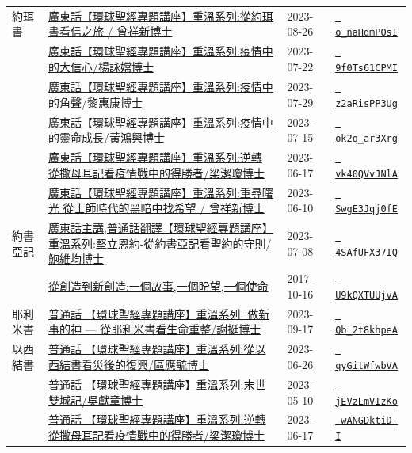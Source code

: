 \documentclass{book}
\begin{document}
{\begin{xltabular}{\textwidth}{|p{0.15\textwidth} p{0.6\textwidth}|p{0.07\textwidth} p{0.1\textwidth}|}
約珥書   & \hyperref[sec:o_naHdmPOsI]{廣東話【環球聖經專題講座】重溫系列:從約珥書看信之旅 / 曾祥新博士} & 2023-08-26 & \href{https://youtube.com/watch?v=o_naHdmPOsI}{\texttt{ o\_naHdmPOsI}} \\
    & \hyperref[sec:9f0Ts61CPMI]{廣東話【環球聖經專題講座】重溫系列:疫情中的大信心/楊詠嫦博士} & 2023-07-22 & \href{https://youtube.com/watch?v=9f0Ts61CPMI}{\texttt{ 9f0Ts61CPMI}} \\
    & \hyperref[sec:z2aRisPP3Ug]{廣東話【環球聖經專題講座】重溫系列:疫情中的角聲/黎惠康博士} & 2023-07-29 & \href{https://youtube.com/watch?v=z2aRisPP3Ug}{\texttt{ z2aRisPP3Ug}} \\
    & \hyperref[sec:ok2q_ar3Xrg]{廣東話【環球聖經專題講座】重溫系列:疫情中的靈命成長/黃鴻興博士} & 2023-07-15 & \href{https://youtube.com/watch?v=ok2q_ar3Xrg}{\texttt{ ok2q\_ar3Xrg}} \\
    & \hyperref[sec:vk40QVvJNlA]{廣東話【環球聖經專題講座】重溫系列:逆轉 從撒母耳記看疫情戰中的得勝者/梁潔瓊博士} & 2023-06-17 & \href{https://youtube.com/watch?v=vk40QVvJNlA}{\texttt{ vk40QVvJNlA}} \\
    & \hyperref[sec:SwgE3Jqj0fE]{廣東話【環球聖經專題講座】重溫系列:重尋曙光 從士師時代的黑暗中找希望 / 曾祥新博士} & 2023-06-10 & \href{https://youtube.com/watch?v=SwgE3Jqj0fE}{\texttt{ SwgE3Jqj0fE}} \\
約書亞記   & \hyperref[sec:4SAfUFX37IQ]{廣東話主講,普通話翻譯【環球聖經專題講座】重溫系列:堅立恩約-從約書亞記看聖約的守則/鮑維均博士} & 2023-07-08 & \href{https://youtube.com/watch?v=4SAfUFX37IQ}{\texttt{ 4SAfUFX37IQ}} \\
    & \hyperref[sec:U9kQXTUUjvA]{從創造到新創造:一個故事,一個盼望,一個使命} & 2017-10-16 & \href{https://youtube.com/watch?v=U9kQXTUUjvA}{\texttt{ U9kQXTUUjvA}} \\
耶利米書   & \hyperref[sec:Qb_2t8khpeA]{普通話 【環球聖經專題講座】重溫系列: 做新事的神 — 從耶利米書看生命重整/謝挺博士} & 2023-09-17 & \href{https://youtube.com/watch?v=Qb_2t8khpeA}{\texttt{ Qb\_2t8khpeA}} \\
以西結書   & \hyperref[sec:qyGitWfwbVA]{普通話 【環球聖經專題講座】重溫系列:從以西結書看災後的復興/區應毓博士} & 2023-06-26 & \href{https://youtube.com/watch?v=qyGitWfwbVA}{\texttt{ qyGitWfwbVA}} \\
    & \hyperref[sec:jEVzLmVIzKo]{普通話 【環球聖經專題講座】重溫系列:末世雙城記/吳獻章博士} & 2023-05-10 & \href{https://youtube.com/watch?v=jEVzLmVIzKo}{\texttt{ jEVzLmVIzKo}} \\
    & \hyperref[sec:wANGDktiD_I]{普通話 【環球聖經專題講座】重溫系列:逆轉 從撒母耳記看疫情戰中的得勝者/梁潔瓊博士} & 2023-06-17 & \href{https://youtube.com/watch?v=wANGDktiD-I}{\texttt{ wANGDktiD-I}} \\

\end{xltabular}}
\end{document}
